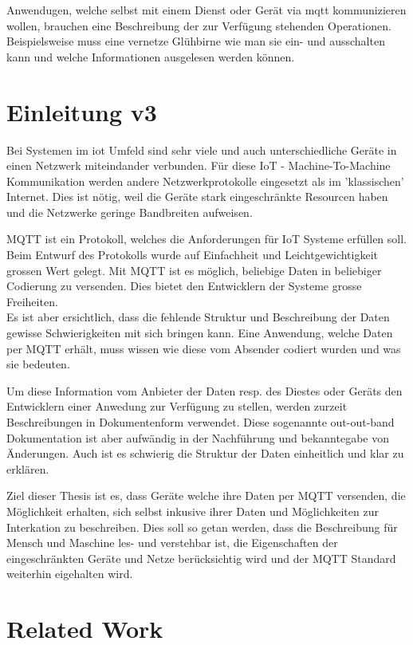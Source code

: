 Anwendugen, welche selbst mit einem Dienst oder Gerät via \Gls{mqtt} kommunizieren wollen, brauchen eine Beschreibung der zur Verfügung stehenden Operationen. Beispielsweise muss eine vernetze Glühbirne wie man sie ein- und ausschalten kann und welche Informationen ausgelesen werden können.

\chapter{Einleitung v3}
Bei Systemen im \acrfull{iot} Umfeld sind sehr viele und auch unterschiedliche Geräte in einen Netzwerk miteindander verbunden. 
Für diese IoT - Machine-To-Machine Kommunikation werden andere Netzwerkprotokolle eingesetzt als im 'klassischen' Internet. Dies ist nötig, weil die Geräte stark eingeschränkte Resourcen haben und die Netzwerke geringe Bandbreiten aufweisen.

MQTT ist ein Protokoll, welches die Anforderungen für IoT Systeme erfüllen soll. Beim Entwurf des Protokolls wurde auf Einfachheit und Leichtgewichtigkeit grossen Wert gelegt. Mit MQTT ist es möglich, beliebige Daten in beliebiger Codierung zu versenden. Dies bietet den Entwicklern der Systeme grosse Freiheiten. \\
Es ist aber ersichtlich, dass die fehlende Struktur und Beschreibung der Daten gewisse Schwierigkeiten mit sich bringen kann. Eine Anwendung, welche Daten per MQTT erhält, muss wissen wie diese vom Absender codiert wurden und was sie bedeuten.

Um diese Information vom Anbieter der Daten resp. des Diestes oder Geräts den Entwicklern einer Anwedung zur Verfügung zu stellen, werden zurzeit Beschreibungen in Dokumentenform verwendet. Diese sogenannte out-out-band Dokumentation ist aber aufwändig in der Nachführung und bekanntegabe von Änderungen. Auch ist es schwierig die Struktur der Daten einheitlich und klar zu erklären.

Ziel dieser Thesis ist es, dass Geräte welche ihre Daten per MQTT versenden, die Möglichkeit erhalten, sich selbst inkusive ihrer Daten und Möglichkeiten zur Interkation zu beschreiben. Dies soll so getan werden, dass die Beschreibung für Mensch und Maschine les- und verstehbar ist, die Eigenschaften der eingeschränkten Geräte und Netze berücksichtig wird und der MQTT Standard weiterhin eigehalten wird.


\chapter{Related Work}

